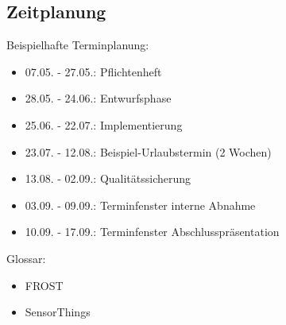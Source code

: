 \documentclass[12 pt]{article}
\begin{document}
\subsection{Zeitplanung}
Beispielhafte Terminplanung: \\
\begin{itemize}
	\item 07.05. - 27.05.: Pflichtenheft
	\item 28.05. - 24.06.: Entwurfsphase
	\item 25.06. - 22.07.: Implementierung
	\item 23.07. - 12.08.: Beispiel-Urlaubstermin (2 Wochen)
	\item 13.08. - 02.09.: Qualitätssicherung
	\item 03.09. - 09.09.: Terminfenster interne Abnahme
	\item 10.09. - 17.09.: Terminfenster Abschlusspräsentation
\end{itemize}


Glossar:
\begin{itemize}
\item FROST
\item SensorThings
\end{itemize}
\end{document}
